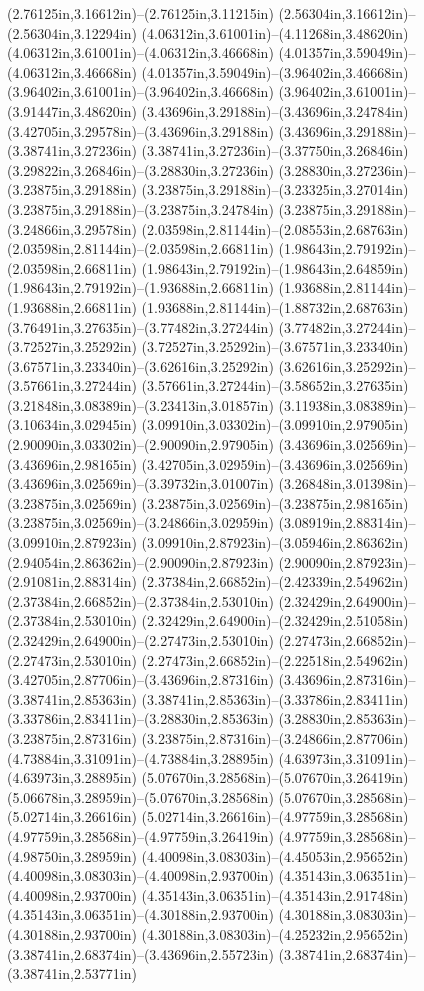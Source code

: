 (2.76125in,3.16612in)--(2.76125in,3.11215in) (2.56304in,3.16612in)--(2.56304in,3.12294in) (4.06312in,3.61001in)--(4.11268in,3.48620in) (4.06312in,3.61001in)--(4.06312in,3.46668in) (4.01357in,3.59049in)--(4.06312in,3.46668in) (4.01357in,3.59049in)--(3.96402in,3.46668in) (3.96402in,3.61001in)--(3.96402in,3.46668in) (3.96402in,3.61001in)--(3.91447in,3.48620in) (3.43696in,3.29188in)--(3.43696in,3.24784in) (3.42705in,3.29578in)--(3.43696in,3.29188in) (3.43696in,3.29188in)--(3.38741in,3.27236in) (3.38741in,3.27236in)--(3.37750in,3.26846in) (3.29822in,3.26846in)--(3.28830in,3.27236in) (3.28830in,3.27236in)--(3.23875in,3.29188in) (3.23875in,3.29188in)--(3.23325in,3.27014in) (3.23875in,3.29188in)--(3.23875in,3.24784in) (3.23875in,3.29188in)--(3.24866in,3.29578in) (2.03598in,2.81144in)--(2.08553in,2.68763in) (2.03598in,2.81144in)--(2.03598in,2.66811in) (1.98643in,2.79192in)--(2.03598in,2.66811in) (1.98643in,2.79192in)--(1.98643in,2.64859in) (1.98643in,2.79192in)--(1.93688in,2.66811in) (1.93688in,2.81144in)--(1.93688in,2.66811in) (1.93688in,2.81144in)--(1.88732in,2.68763in) (3.76491in,3.27635in)--(3.77482in,3.27244in) (3.77482in,3.27244in)--(3.72527in,3.25292in) (3.72527in,3.25292in)--(3.67571in,3.23340in) (3.67571in,3.23340in)--(3.62616in,3.25292in) (3.62616in,3.25292in)--(3.57661in,3.27244in) (3.57661in,3.27244in)--(3.58652in,3.27635in) (3.21848in,3.08389in)--(3.23413in,3.01857in) (3.11938in,3.08389in)--(3.10634in,3.02945in) (3.09910in,3.03302in)--(3.09910in,2.97905in) (2.90090in,3.03302in)--(2.90090in,2.97905in) (3.43696in,3.02569in)--(3.43696in,2.98165in) (3.42705in,3.02959in)--(3.43696in,3.02569in) (3.43696in,3.02569in)--(3.39732in,3.01007in) (3.26848in,3.01398in)--(3.23875in,3.02569in) (3.23875in,3.02569in)--(3.23875in,2.98165in) (3.23875in,3.02569in)--(3.24866in,3.02959in) (3.08919in,2.88314in)--(3.09910in,2.87923in) (3.09910in,2.87923in)--(3.05946in,2.86362in) (2.94054in,2.86362in)--(2.90090in,2.87923in) (2.90090in,2.87923in)--(2.91081in,2.88314in) (2.37384in,2.66852in)--(2.42339in,2.54962in) (2.37384in,2.66852in)--(2.37384in,2.53010in) (2.32429in,2.64900in)--(2.37384in,2.53010in) (2.32429in,2.64900in)--(2.32429in,2.51058in) (2.32429in,2.64900in)--(2.27473in,2.53010in) (2.27473in,2.66852in)--(2.27473in,2.53010in) (2.27473in,2.66852in)--(2.22518in,2.54962in) (3.42705in,2.87706in)--(3.43696in,2.87316in) (3.43696in,2.87316in)--(3.38741in,2.85363in) (3.38741in,2.85363in)--(3.33786in,2.83411in) (3.33786in,2.83411in)--(3.28830in,2.85363in) (3.28830in,2.85363in)--(3.23875in,2.87316in) (3.23875in,2.87316in)--(3.24866in,2.87706in) (4.73884in,3.31091in)--(4.73884in,3.28895in) (4.63973in,3.31091in)--(4.63973in,3.28895in) (5.07670in,3.28568in)--(5.07670in,3.26419in) (5.06678in,3.28959in)--(5.07670in,3.28568in) (5.07670in,3.28568in)--(5.02714in,3.26616in) (5.02714in,3.26616in)--(4.97759in,3.28568in) (4.97759in,3.28568in)--(4.97759in,3.26419in) (4.97759in,3.28568in)--(4.98750in,3.28959in) (4.40098in,3.08303in)--(4.45053in,2.95652in) (4.40098in,3.08303in)--(4.40098in,2.93700in) (4.35143in,3.06351in)--(4.40098in,2.93700in) (4.35143in,3.06351in)--(4.35143in,2.91748in) (4.35143in,3.06351in)--(4.30188in,2.93700in) (4.30188in,3.08303in)--(4.30188in,2.93700in) (4.30188in,3.08303in)--(4.25232in,2.95652in) (3.38741in,2.68374in)--(3.43696in,2.55723in) (3.38741in,2.68374in)--(3.38741in,2.53771in) 